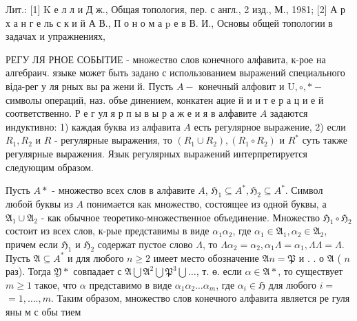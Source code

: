 \documentclass[10pt]{article}
\begin{document}
Лит.: [1] $\mathrm{K}$ е л л и Д ж., Общая топология, пер. с англ., 2 изд., М., 1981; [2] А р х а н г е ль с к и й А В., П о н о м а p е в В. И., Основы общей топологии в задачах и упражнениях,



РЕГУ ЛЯ РНОЕ СОБЫТИЕ - множество слов конечного алфавита, к-рое на алгебраич. языке может быть задано с использованием выражений специального віда-рег у ля рных вы ра жени й. Пусть $A-$ конечный алфовит и $\mathrm{U}, \circ, *-$ символы операций, наз. объе динением, конкатен ацие й и и т е р а ц и е й соответственно. Р е г ул я р п ы в ы р а ж е и я в алфавите $A$ задаются индуктивно: 1) каждая буква из алфавита $A$ есть регулярное выражение, 2) если $R_{1}, R_{2}$ и $R$ - регулярные выражения, то $\left(R_{1} \cup R_{2}\right),\left(R_{1} \circ R_{2}\right)$ и $R^{*}$ суть также регулярные выражения. Язык регулярных выражений интерпретируется следующим образом.



Пусть $A *$ - множество всех слов в алфавите $A$, $\mathfrak{H}_{1} \subseteq A^{*}, \mathfrak{H}_{2} \subseteq A^{*}$. Символ любой буквы из $A$ понимается как множество, состоящее из одной буквы, а $\mathfrak{A}_{1} \cup \mathfrak{A}_{2}$ - как обычное теоретико-множественное объединение. Множество $\mathfrak{H}_{1} \circ \mathfrak{H}_{2}$ состоит из всех слов, к-рые представимы в виде $\alpha_{1} \alpha_{2}$, где $\alpha_{1} \in \mathfrak{A}_{1}, \alpha_{2} \in \mathfrak{A}_{2}$, причем если $\mathfrak{H}_{1}$ и $\mathfrak{H}_{2}$ содержат пустое слово $\Lambda$, то $\Lambda \alpha_{2}=\alpha_{2}, \alpha_{1} \Lambda=\alpha_{1}, \Lambda \Lambda=\Lambda$. Пусть $\mathfrak{A} \subseteq A^{*}$ и для любого $n \geqslant 2$ имеет место обозначение $\mathfrak{A} n=\mathfrak{P}$ и . . о $\mathfrak{A}$ ( $n$ раз). Тогда $\mathfrak{Y} *$ совпадает с $\mathfrak{A} \bigcup \mathfrak{A}^{2} \bigcup \mathfrak{P}^{3} \bigcup \ldots$, т. ө. если $\alpha \in \mathfrak{A} *$, то существует $m \geqslant 1$ такое, что $\alpha$ представимо в виде $\alpha_{1} \alpha_{2} \ldots \alpha_{m}$, где $\alpha_{i} \in \mathfrak{H}$ для любого $i=$ $=1, \ldots ., m$. Таким образом, множество слов конечного алфавита является ре гуля яны м с обы тием
\end{document}
